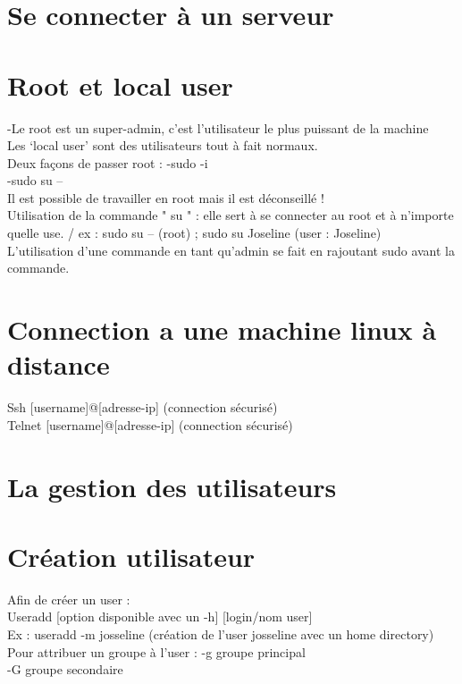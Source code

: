 \documentclass[11pt,a4peper]{article}
\begin{document}
\section{Se connecter à un serveur}
\section{Root et local user}

-Le root est un super-admin, c’est l’utilisateur le plus puissant de la machine\\
Les ‘local user’ sont des utilisateurs tout à fait normaux.\\
Deux façons de passer root : 	-sudo -i\\
								-sudo su –\\
Il est possible de travailler en root mais il est déconseillé !\\
Utilisation de la commande " su " : elle sert à se connecter au root et à n’importe quelle use. / ex : sudo su – (root) ; sudo su Joseline (user : Joseline)\\
L’utilisation d’une commande en tant qu’admin se fait en rajoutant sudo avant la commande.\\

\section{Connection a une machine linux à distance}

Ssh [username]@[adresse-ip] (connection sécurisé)\\
Telnet [username]@[adresse-ip] (connection sécurisé)

\section{La gestion des utilisateurs}
\section{Création utilisateur}

Afin de créer un user :\\
Useradd [option disponible avec un -h] [login/nom user]\\
Ex : useradd -m josseline (création de l’user josseline avec un home directory)\\
Pour attribuer un groupe à l’user :	-g groupe principal\\
									-G groupe secondaire\\
									
\end{document}
